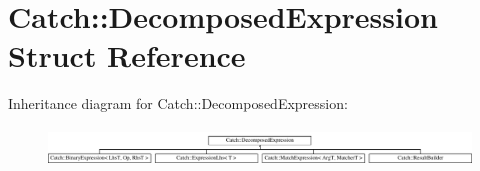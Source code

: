 \hypertarget{structCatch_1_1DecomposedExpression}{}\section{Catch\+:\+:Decomposed\+Expression Struct Reference}
\label{structCatch_1_1DecomposedExpression}
Inheritance diagram for Catch\+:\+:Decomposed\+Expression\+:\begin{figure}[H]
\begin{center}
\leavevmode
\includegraphics[height=1.029412cm]{structCatch_1_1DecomposedExpression}
\end{center}
\end{figure}
